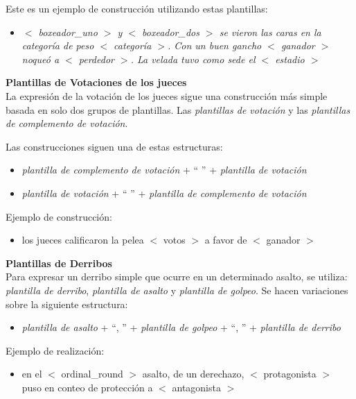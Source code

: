     Este es un ejemplo de construcción utilizando estas plantillas:
    \begin{itemize}
        \item \textit{$<$ boxeador\_uno $>$ y $<$ boxeador\_dos $>$ se vieron las caras en la categoría de peso $<$ categoría $>$. Con un buen 
        gancho $<$ ganador $>$ noqueó a $<$ perdedor $>$. La velada tuvo como sede el $<$ estadio $>$}
    \end{itemize}


    \textbf{Plantillas de Votaciones de los jueces}\\

    La expresión de la votación de los jueces sigue una construcción más simple basada en solo dos grupos de plantillas. 
Las \textit{plantillas de votación} y las \textit{plantillas de complemento de votación}.
    
    Las construcciones siguen una de estas estructuras:
    \begin{itemize}
        \item \textit{plantilla de complemento de votación} + “ ” + \textit{plantilla de votación}
        \item \textit{plantilla de votación} + “ ” + \textit{plantilla de complemento de votación}
    \end{itemize}

    Ejemplo de construcción:
    \begin{itemize}
        \item los jueces calificaron la pelea $<$ votos $>$ a favor de $<$ ganador $>$
    \end{itemize}



    \textbf{Plantillas de Derribos}\\

    Para expresar un derribo simple que ocurre en un determinado asalto, se utiliza: \textit{plantilla de derribo}, 
    \textit{plantilla de asalto} y \textit{plantilla de golpeo}. Se hacen variaciones sobre la siguiente estructura:
    \begin{itemize}
        \item \textit{plantilla de asalto} + “, ” + \textit{plantilla de golpeo} + “, ” + \textit{plantilla de derribo}
    \end{itemize}
    Ejemplo de realización:
    \begin{itemize}
        \item en el $<$ ordinal\_round $>$ asalto, de un derechazo, $<$ protagonista $>$ puso en conteo de protección a $<$ antagonista $>$
    \end{itemize}

